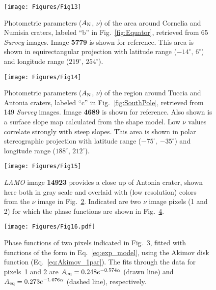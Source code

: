 \documentclass[3p,authoryear]{elsarticle}
\begin{document}

\begin{figure}
\centering
\texttt{[image: Figures/Fig13]}
\caption{Photometric parameters ($A_{\rm N}$, $\nu$) of the area around Cornelia and Numisia craters, labeled ``b'' in Fig.~\ref{fig:Equator}, retrieved from 65 {\it Survey} images. Image {\bf 5779} is shown for reference. This area is shown in equirectangular projection with latitude range ($-14^\circ$, $6^\circ$) and longitude range ($219^\circ$, $254^\circ$).}
\label{fig:Cornelia}
\end{figure}


\begin{figure}
\centering
\texttt{[image: Figures/Fig14]}
\caption{Photometric parameters ($A_{\rm N}$, $\nu$) of the region around Tuccia and Antonia craters, labeled ``c'' in Fig.~\ref{fig:SouthPole}, retrieved from 149 {\it Survey} images. Image {\bf 4689} is shown for reference. Also shown is a surface slope map calculated from the shape model. Low $\nu$ values correlate strongly with steep slopes. This area is shown in polar stereographic projection with latitude range ($-75^\circ$, $-35^\circ$) and longitude range ($188^\circ$, $212^\circ$).}
\label{fig:YinYang}
\end{figure}


\begin{figure}
\centering
\texttt{[image: Figures/Fig15]}
\caption{{\it LAMO} image {\bf 14923} provides a close up of Antonia crater, shown here both in gray scale and overlaid with (low resolution) colors from the $\nu$ image in Fig.~\ref{fig:YinYang}. Indicated are two $\nu$ image pixels (1 and 2) for which the phase functions are shown in Fig.~\ref{fig:phase_curves_Antonia}.}
\label{fig:Antonia}
\end{figure}


\begin{figure}
\centering
\texttt{[image: Figures/Fig16.pdf]}
\caption{Phase functions of two pixels indicated in Fig.~\ref{fig:Antonia}, fitted with functions of the form in Eq.~\ref{eq:exp_model}, using the Akimov disk function (Eq.~\ref{eq:Akimov_1par}). The fits through the data for pixels~1 and 2 are $A_{\rm eq} = 0.248 e^{-0.574 \alpha}$ (drawn line) and $A_{\rm eq} = 0.273 e^{-1.076 \alpha}$ (dashed line), respectively.}
\label{fig:phase_curves_Antonia}
\end{figure}
\end{document}
